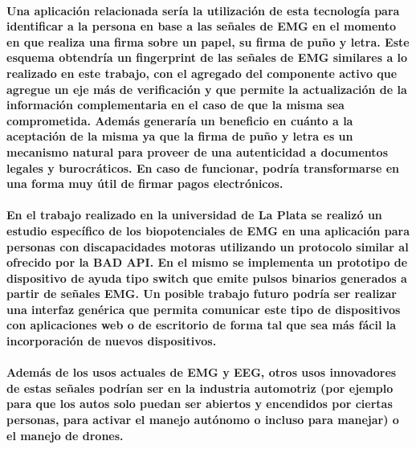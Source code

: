 \documentclass{article}
\begin{document}
\paragraph{
Una aplicación relacionada sería la utilización de esta tecnología para identificar a la persona en base a las señales de EMG en el momento en que realiza una firma sobre un papel, su firma de puño y letra.  Este esquema obtendría un fingerprint de las señales de EMG similares a lo realizado en este trabajo, con el agregado del componente activo que agregue un eje más de verificación y que permite la actualización de la información complementaria en el caso de que la misma sea comprometida.  Además generaría un beneficio en cuánto a la aceptación de la misma ya que la firma de puño y letra es un mecanismo natural para proveer de una autenticidad a documentos legales y burocráticos. En caso de funcionar, podría transformarse en una forma muy útil de firmar pagos electrónicos.
}

\paragraph{
En el trabajo realizado en la universidad de La Plata \cite{haberman2016} se realizó un estudio específico de los biopotenciales de EMG en una aplicación para personas con discapacidades motoras utilizando un protocolo similar al ofrecido por la BAD API. En el mismo se implementa un prototipo de dispositivo de ayuda tipo switch que emite pulsos binarios generados a partir de señales EMG. Un posible trabajo futuro podría ser realizar una interfaz genérica que permita comunicar este tipo de dispositivos con aplicaciones web o de escritorio de forma tal que sea más fácil la incorporación de nuevos dispositivos.
}

\paragraph{
Además de los usos actuales de EMG y EEG, otros usos innovadores de estas señales podrían ser en la industria automotriz (por ejemplo para que los autos solo puedan ser abiertos y encendidos por ciertas personas, para activar el manejo autónomo o incluso para manejar) o el manejo de drones.
}



\clearpage
\nocite{opinnovationswebsite}
\nocite{charbit2017}
\nocite{bressert2012}
\nocite{angkoon2009}
\nocite{oliphant2015}
\nocite{langtangen2016}
\nocite{hassanien2015}
\nocite{moonwon2016}
\nocite{sharma2016}
\nocite{trewin}
\nocite{chowdhury2013}
\nocite{siqueira2015}
\nocite{samsung2016}
\nocite{raez2006}
\nocite{esparza2017}
\nocite{sanei2007}
\nocite{haberman2016}

\printbibliography[heading=bibintoc,title={Bibliografía}]
\end{document}
